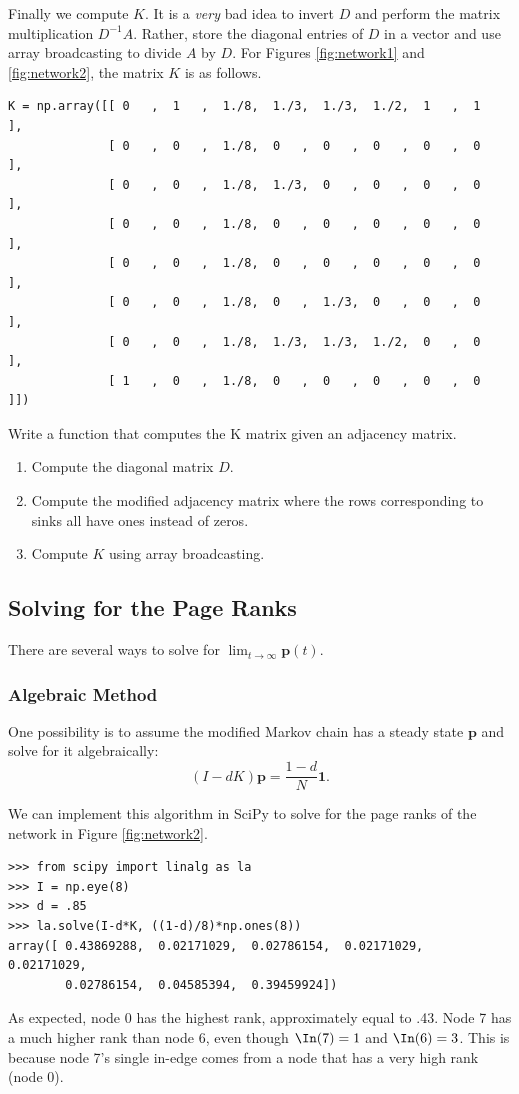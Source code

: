 Finally we compute $K$.
It is a \emph{very} bad idea to invert $D$ and perform the matrix multiplication $D^{-1}A$.
Rather, store the diagonal entries of $D$ in a vector and use array broadcasting to divide $A$ by $D$.
For Figures \ref{fig:network1} and \ref{fig:network2}, the matrix $K$ is as follows.

\begin{lstlisting}
K = np.array([[ 0   ,  1   ,  1./8,  1./3,  1./3,  1./2,  1   ,  1   ],
              [ 0   ,  0   ,  1./8,  0   ,  0   ,  0   ,  0   ,  0   ],
              [ 0   ,  0   ,  1./8,  1./3,  0   ,  0   ,  0   ,  0   ],
              [ 0   ,  0   ,  1./8,  0   ,  0   ,  0   ,  0   ,  0   ],
              [ 0   ,  0   ,  1./8,  0   ,  0   ,  0   ,  0   ,  0   ],
              [ 0   ,  0   ,  1./8,  0   ,  1./3,  0   ,  0   ,  0   ],
              [ 0   ,  0   ,  1./8,  1./3,  1./3,  1./2,  0   ,  0   ],
              [ 1   ,  0   ,  1./8,  0   ,  0   ,  0   ,  0   ,  0   ]])
\end{lstlisting}
\begin{problem}
Write a function that computes the K matrix given an adjacency matrix.
\begin{enumerate}
\item Compute the diagonal matrix $D$.
\item Compute the modified adjacency matrix where the rows corresponding to sinks all have ones instead of zeros.
\item Compute $K$ using array broadcasting.
\end{enumerate}
\end{problem}


\subsection*{Solving for the Page Ranks}
There are several ways to solve for $\lim_{t \to \infty} \mathbf{p}(t)$.
\subsubsection*{Algebraic Method}
One possibility is to assume the modified Markov chain has a steady state $\mathbf{p}$ and solve for it algebraically:
\begin{equation}\label{equ:matrix_solve}
(I-dK)\mathbf{p} = \frac{1-d}{N} \mathbf{1}.
\end{equation}

We can implement this algorithm in SciPy to solve for the page ranks of the network in Figure \ref{fig:network2}.
\begin{lstlisting}
>>> from scipy import linalg as la
>>> I = np.eye(8)
>>> d = .85
>>> la.solve(I-d*K, ((1-d)/8)*np.ones(8))
array([ 0.43869288,  0.02171029,  0.02786154,  0.02171029,  0.02171029,
        0.02786154,  0.04585394,  0.39459924])
\end{lstlisting}
As expected, node 0 has the highest rank, approximately equal to .43. 
Node 7 has a much higher rank than node 6, even though $\In(7)=1$ and $\In(6)=3$. 
This is because node 7's single in-edge comes from a node that has a very high rank (node 0).

